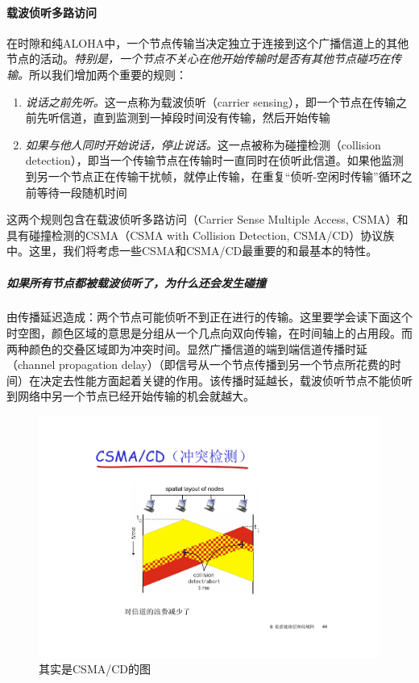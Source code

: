 \documentclass[]{report}
\begin{document}
			\paragraph{载波侦听多路访问}
			在时隙和纯ALOHA中，一个节点传输当决定独立于连接到这个广播信道上的其他节点的活动。\textit{特别是，一个节点不关心在他开始传输时是否有其他节点碰巧在传输。}所以我们增加两个重要的规则：
			\begin{enumerate}
				\item \textit{说话之前先听。}这一点称为载波侦听（carrier sensing），即一个节点在传输之前先听信道，直到监测到一掉段时间没有传输，然后开始传输
				\item \textit{如果与他人同时开始说话，停止说话。}这一点被称为碰撞检测（collision detection），即当一个传输节点在传输时一直同时在侦听此信道。如果他监测到另一个节点正在传输干扰帧，就停止传输，在重复“侦听-空闲时传输”循环之前等待一段随机时间
			\end{enumerate}\par
			这两个规则包含在载波侦听多路访问（Carrier Sense Multiple Access, CSMA）和具有碰撞检测的CSMA（CSMA with Collision Detection, CSMA/CD）协议族中。这里，我们将考虑一些CSMA和CSMA/CD最重要的和最基本的特性。\par
				\subparagraph{如果所有节点都被载波侦听了，为什么还会发生碰撞}
				由传播延迟造成：两个节点可能侦听不到正在进行的传输。这里要学会读下面这个时空图，颜色区域的意思是分组从一个几点向双向传输，在时间轴上的占用段。而两种颜色的交叠区域即为冲突时间。显然广播信道的端到端信道传播时延（channel propagation delay）（即信号从一个节点传播到另一个节点所花费的时间）在决定去性能方面起着关键的作用。该传播时延越长，载波侦听节点不能侦听到网络中另一个节点已经开始传输的机会就越大。
				\begin{figure}[h]
					\centering
					\begin{minipage}{40em}
						\centering
						\includegraphics[scale = 0.5]{images/CSMA_collision.pdf}
						\caption{其实是CSMA/CD的图}
					\end{minipage}
				\end{figure}
\end{document}
